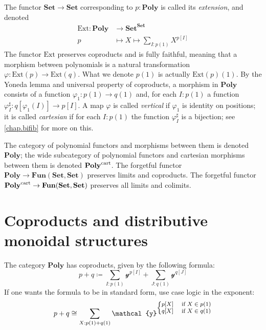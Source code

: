 \documentclass[11pt, one side, article]{memoir}
\theoremstyle{definition}
\theoremstyle{plain}
\newcommand{\Cat}[1]{\mathbf{#1}}%
\newcommand{\fun}[1]{\mathrm{#1}}%
\newcommand{\tn}[1]{\textnormal{#1}}
\newcommand{\smset}{\Cat{Set}}
\newcommand{\yon}{\mathcal{y}}
\newcommand{\poly}{\Cat{Poly}}
\newcommand{\polycart}{\poly^{\tn{cart}}}
\newcommand{\0}{\textsf{0}}
\newcommand{\1}{\tn{\textsf{1}}}
\newcommand{\ext}{\fun{Ext}}
\begin{document}
The functor $\smset\to\smset$ corresponding to $p:\poly$ is called its \emph{extension}, and denoted
\begin{align}
\ext\colon\poly&\to\smset^\smset\label{ext_functor}\\
p&\mapsto X\mapsto\sum_{I:p(1)}X^{p[I]}
\end{align} 
The functor $\ext$ preserves coproducts and is fully faithful, meaning that a morphism between polynomials is a natural transformation $\varphi\colon \ext(p)\to \ext(q)$. What we denote $p(1)$ is actually $\ext(p)(1)$. By the Yoneda lemma and universal property of coproducts, a morphism in $\poly$ consists of a function $\varphi_1\colon p(1)\to q(1)$ and, for each $I: p(1)$ a function $\varphi^\sharp_I\colon q[\varphi_1(I)]\to p[I]$. A map $\varphi$ is called \emph{vertical} if $\varphi_1$ is identity on positions; it is called \emph{cartesian} if for each $I: p(1)$ the function $\varphi_I^\sharp$ is a bijection; see \cref{chap.bifib} for more on this. 

The category of polynomial functors and morphisms between them is denoted $\poly$; the wide subcategory of polynomial functors and cartesian morphisms between them is denoted $\polycart$. The forgetful functor $\poly\to\Cat{Fun}(\smset,\smset)$ preserves limits and coproducts. The forgetful functor $\polycart\to\Cat{Fun}(\smset,\smset)$ preserves all limits and colimits.


\chapter{Coproducts and distributive monoidal structures}

The category $\poly$ has coproducts, given by the following formula:
\begin{equation}
p+q\coloneqq\sum_{I: p(1)}\yon^{p[I]}+\sum_{J: q(1)}\yon^{q[J]}
\end{equation}
If one wants the formula to be in standard form, use case logic in the exponent:
\begin{equation}
p+q\cong\sum_{X: p(1)+q(1)}\yon^{\fontsize{8pt}{8pt}\selectfont
	\begin{cases}
  	p[X]&\tn{ if }X\in p(1)\\
  	q[X]&\tn{ if }X\in q(1)
	\end{cases}\normalsize
	}
\end{equation}
\end{document}
